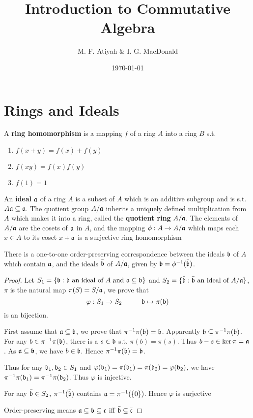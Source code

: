 \documentclass[11pt]{article}
\author{M. F. Atiyah \& I. G. MacDonald}
\date{\today}
\title{Introduction to Commutative Algebra}
\begin{document}
\maketitle
\tableofcontents


\section{Rings and Ideals}
\label{sec:org2730e1f}
A \textbf{ring homomorphism} is a mapping \(f\) of a ring \(A\) into a ring \(B\) s.t.
\begin{enumerate}
\item \(f(x+y)=f(x)+f(y)\)
\item \(f(xy)=f(x)f(y)\)
\item \(f(1)=1\)
\end{enumerate}


An \textbf{ideal} \(\mathfrak{a}\) of a ring \(A\) is a subset of \(A\) which is an additive subgroup and is
s.t. \(A\mathfrak{a}\subseteq\mathfrak{a}\). The quotient group \(A/\mathfrak{a}\) inherits a uniquely defined multiplication from \(A\)
which makes it into a ring, called the \textbf{quotient ring} \(A/\mathfrak{a}\). The elements of \(A/\mathfrak{a}\) are the
cosets of \(\mathfrak{a}\) in \(A\), and the mapping \(\phi:A\to A/\mathfrak{a}\) which maps each \(x\in A\) to its
coset \(x+\mathfrak{a}\) is a surjective ring homomorphism

\begin{proposition}[]
\label{1.1}
There is a one-to-one order-preserving correspondence between the ideals \(\mathfrak{b}\) of \(A\) which
contain \(\mathfrak{a}\), and the ideals \(\bar{\mathfrak{b}}\) of \(A/\mathfrak{a}\), given by \(\mathfrak{b}=\phi^{-1}(\bar{\mathfrak{b}})\).
\end{proposition}

\begin{proof}
Let \(S_1=\{\mathfrak{b}:\mathfrak{b}\text{ an ideal of $A$ and }\mathfrak{a}\subseteq\mathfrak{b}\}\)
and \(S_2=\{\bar{\mathfrak{b}}:\bar{\mathfrak{b}}\text{ an ideal of }A/\mathfrak{a}\}\), \(\pi\) is the natural map \(\pi(S)=S/\mathfrak{a}\), we prove that
\begin{equation*}
\varphi:S_1\to S_2\hspace{1cm}\mathfrak{b}\mapsto\pi(\mathfrak{b})
\end{equation*}
is an bijection.

First assume that \(\mathfrak{a}\subseteq\mathfrak{b}\), we prove that \(\pi^{-1}\pi(\mathfrak{b})=\mathfrak{b}\). Apparently \(\mathfrak{b}\subseteq\pi^{-1}\pi(\mathfrak{b})\). For
any \(b\in\pi^{-1}\pi(\mathfrak{b})\), there is a \(s\in\mathfrak{b}\) s.t. \(\pi(b)=\pi(s)\). Thus \(b-s\in\ker\pi=\mathfrak{a}\). As \(\mathfrak{a}\subseteq\mathfrak{b}\),
we have \(b\in\mathfrak{b}\). Hence \(\pi^{-1}\pi(\mathfrak{b})=\mathfrak{b}\).

Thus for any \(\mathfrak{b}_1,\mathfrak{b}_2\in S_1\) and \(\varphi(\mathfrak{b}_1)=\pi(\mathfrak{b}_1)=\pi(\mathfrak{b}_2)=\varphi(\mathfrak{b}_2)\), we have \(\pi^{-1}\pi(\mathfrak{b}_1)=\pi^{-1}\pi(\mathfrak{b}_2)\).
Thus \(\varphi\) is injective.

For any \(\bar{\mathfrak{b}}\in S_2\), \(\pi^{-1}(\bar{\mathfrak{b}})\) contains \(\mathfrak{a}=\pi^{-1}(\{0\})\). Hence \(\varphi\) is surjective

Order-preserving means \(\mathfrak{a}\subseteq\mathfrak{b}\subseteq\mathfrak{c}\) iff \(\bar{\mathfrak{b}}\subseteq\bar{\mathfrak{c}}\)
\end{proof}
\end{document}

